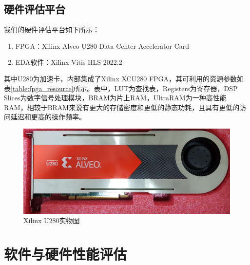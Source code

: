 \subsection{硬件评估平台}
\begin{table}[htbp]
\centering
\caption{XCU280 FPGA可利用资源表}
\label{table:fpga_resource}
\end{table}
我们的硬件评估平台如下所示：
\begin{enumerate}
    \item FPGA：Xilinx Alveo U280 Data Center Accelerator Card
    \item EDA软件：Xilinx Vitis HLS 2022.2
\end{enumerate}

其中U280为加速卡，内部集成了Xilinx XCU280 FPGA，其可利用的资源参数如表\ref{table:fpga_resource}所示。表中，LUT为查找表，Registers为寄存器，DSP Slices为数字信号处理模块，BRAM为片上RAM，UltraRAM为一种高性能RAM，相较于BRAM来说有更大的存储密度和更低的静态功耗，且具有更低的访问延迟和更高的操作频率。
\begin{figure}[htbp]
    \centering
    \includegraphics[width=\linewidth]{figures/U280.png}
    \caption{Xilinx U280实物图}
    \label{fig:U280}
\end{figure}



\section{软件与硬件性能评估}

